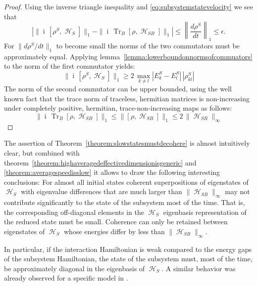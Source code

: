 \documentclass[aps,prl,twocolumn,showpacs,showkeys,a4paper]{revtex4}
\DeclareMathOperator{\Tr}{\mathrm{Tr}}%
\DeclareMathOperator{\iu}{\mathrm{i}}%
\DeclareMathOperator{\haH}{\mathscr{H}}%
\begin{document}
\begin{proof}
  Using the inverse triangle inequality and \eqref{eq:subsystemstatevelocity} we see that
  \begin{equation}
    | \| \iu\,[\rho^S,\haH_S] \|_1 - \| \iu\,\Tr_B[\rho,\haH_{SB}] \|_1 | \leq \left\|\frac{d\rho^S}{dt}\right\|_1 \leq \epsilon .
  \end{equation}
  For $\|d\rho^S/dt\|_1$ to become small the norms of the two commutators must be approximately equal.
  Applying lemma~\ref{lemma:lowerboundonnormsofcommuators} to the norm of the first commutator yields:
  \begin{equation}
    \| \iu\,[\rho^S,\haH_S] \|_1 \geq 2\,\max_{k \neq l} |E^S_k - E^S_l|\,|\rho^S_{kl}|
  \end{equation}
  The norm of the second commutator can be upper bounded, using the well known fact that the trace norm of traceless, hermitian matrices is non-increasing under completely positive, hermitian, trace-non-increasing maps \cite{nielsenm.a.c} as follows:
  \begin{equation}
    \| \iu\,\Tr_B[\rho,\haH_{SB}] \|_1 \leq \| [\rho,\haH_{SB}] \|_1 \leq 2\,\|\haH_{SB}\|_{\infty}
  \end{equation}
\end{proof}

The assertion of Theorem~\ref{theorem:slowstatesmustdecohere} is almost intuitively clear, but combined with theorem~\ref{theorem:highaveragedeffectivedimensionisgeneric} and \ref{theorem:averagespeedisslow} it allows to draw the following interesting conclusions:
For almost all initial states coherent superpositions of eigenstates of $\haH_S$ with eigenvalue differences that are much larger than $\|\haH_{SB}\|_\infty$ may not contribute significantly to the state of the subsystem most of the time.
That is, the corresponding off-diagonal elements in the $\haH_S$ eigenbasis representation of the reduced state must be small.
Coherence can only be retained between eigenstates of $\haH_S$ whose energies differ by less than $\|\haH_{SB}\|_\infty$.

In particular, if the interaction Hamiltonian is weak compared to the energy gaps of the subsystem Hamiltonian, the state of the subsystem must, most of the time, be approximately diagonal in the eigenbasis of $\haH_S$.
A similar behavior was already observed for a specific model in \cite{PhysRevLett.82}.

\vspace{1cm}
\end{document}
